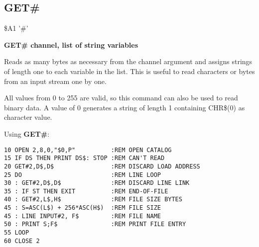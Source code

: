 \subsection{GET\#}
\begin{description}[leftmargin=2cm,style=nextline]
\item [Token:] \$A1 '\#'
\item [Format:] {\bf GET\# channel, list of string variables}
\item [Usage:] Reads as many bytes
               as necessary from the channel argument
               and assigns strings of length one to
               each variable in the list.
               This is useful to read characters or bytes from
               an input stream one by one.

\item [Remarks:] All values from 0 to 255 are valid, so this
               command can also be used to read binary data.
               A value of 0 generates a string of length 1
               containing CHR\$(0) as character value.

\item [Example:] Using {\bf GET\#}:
\begin{tcolorbox}[colback=black,coltext=white]
\verbatimfont{\codefont}
\begin{verbatim}
10 OPEN 2,8,0,"$0,P"          :REM OPEN CATALOG
15 IF DS THEN PRINT DS$: STOP :REM CAN'T READ
20 GET#2,D$,D$                :REM DISCARD LOAD ADDRESS
25 DO                         :REM LINE LOOP
30 : GET#2,D$,D$              :REM DISCARD LINE LINK
35 : IF ST THEN EXIT          :REM END-OF-FILE
40 : GET#2,L$,H$              :REM FILE SIZE BYTES
45 : S=ASC(L$) + 256*ASC(H$)  :REM FILE SIZE
45 : LINE INPUT#2, F$         :REM FILE NAME
50 : PRINT S;F$               :REM PRINT FILE ENTRY
55 LOOP
60 CLOSE 2
\end{verbatim}
\end{tcolorbox}
\end{description}


\newpage
